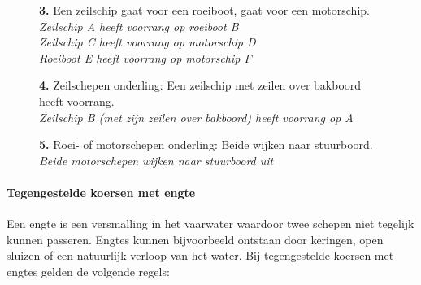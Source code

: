 \begin{figure}[H]
	\centering
	\begin{minipage}[t]{0.70\textwidth}
		\textbf{3.} Een zeilschip gaat voor een roeiboot, gaat voor een motorschip.\\
		\textit{Zeilschip A heeft voorrang op roeiboot B \\
				Zeilschip C heeft voorrang op motorschip D \\
				Roeiboot E heeft voorrang op motorschip F}
	\end{minipage}
	\hfill
	\begin{minipage}[t]{0.25\textwidth}
		\label{pic:tg3a}
	\end{minipage}
	\hfill
\end{figure}
\vspace{-0.7cm}

\begin{figure}[H]
	\centering
	\begin{minipage}[t]{0.70\textwidth}
		\textbf{4.} Zeilschepen onderling: Een zeilschip met zeilen over bakboord heeft voorrang.\\
		\textit{Zeilschip B (met zijn zeilen over bakboord) heeft voorrang op A}
	\end{minipage}
	\hfill
	\begin{minipage}[t]{0.25\textwidth}
		\label{pic:tg4}
	\end{minipage}
	\hfill
\end{figure}
\vspace{-0.7cm}

\begin{figure}[H]
	\centering
	\begin{minipage}[t]{0.70\textwidth}
		\textbf{5.} Roei- of motorschepen onderling: Beide wijken naar stuurboord.\\
		\textit{Beide motorschepen wijken naar stuurboord uit}
	\end{minipage}
	\hfill
	\begin{minipage}[t]{0.25\textwidth}
		\label{pic:tg5}
	\end{minipage}
	\hfill
\end{figure}

\paragraph{Tegengestelde koersen met engte}
Een engte is een versmalling in het vaarwater waardoor twee schepen niet tegelijk kunnen passeren. Engtes kunnen bijvoorbeeld ontstaan door keringen, open sluizen of een natuurlijk verloop van het water. Bij tegengestelde koersen met engtes gelden de volgende regels:

